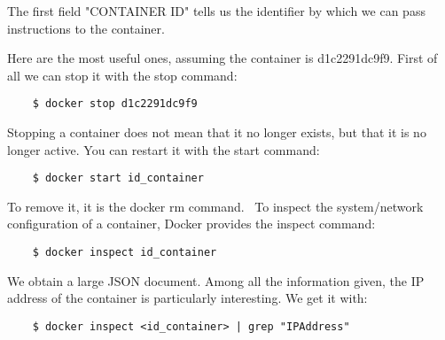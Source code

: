 \documentclass[handout]{beamer}[10pt, usepdftitle=false]
\begin{document}
	\begin{frame}[fragile]
	The first field "CONTAINER ID" tells us the identifier by which we can pass instructions to the container. 
	\vspace*{0.6em}
	
	Here are the most useful ones, assuming the container is d1c2291dc9f9. First of all we can stop it with the stop command:
	\vspace*{0.6em}
	
	\begin{verbatim}
	$ docker stop d1c2291dc9f9
	\end{verbatim}
	
	Stopping a container does not mean that it no longer exists, but that it is no longer active. You can restart it with the start command:
	\vspace*{0.6em}	
	
	\begin{verbatim}
	$ docker start id_container
	\end{verbatim}		

	To remove it, it is the docker rm command. \
	To inspect the system/network configuration of a container, Docker provides the inspect command:
	\vspace*{0.6em}
	
	\begin{verbatim}
	$ docker inspect id_container
	\end{verbatim}
	
	We obtain a large JSON document. Among all the information given, the IP address of the container is particularly interesting. We get it with:
	\vspace*{0.6em}
	
	\begin{verbatim}
	$ docker inspect <id_container> | grep "IPAddress"
	\end{verbatim}
	
		
	\end{frame}
\end{document}
